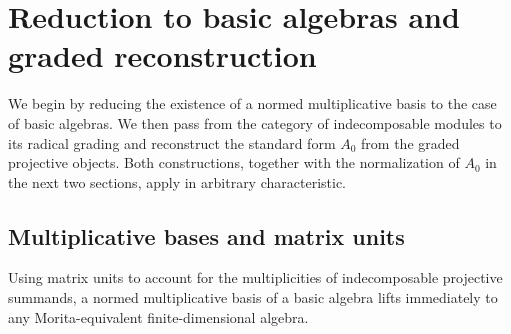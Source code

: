 \section{Reduction to basic algebras and graded reconstruction}
\label{sec:graded-category}

We begin by reducing the existence of a normed multiplicative basis to the
case of basic algebras. We then pass from the category of indecomposable
modules to its radical grading and reconstruct the standard form $A_0$ from
the graded projective objects. Both constructions, together with the
normalization of $A_0$ in the next two sections, apply in arbitrary
characteristic.

\subsection{Multiplicative bases and matrix units}
\label{subsec:nonbasic-basis}

Using matrix units to account for the multiplicities of indecomposable
projective summands, a normed multiplicative basis of a basic algebra lifts
immediately to any Morita-equivalent finite-dimensional algebra.

